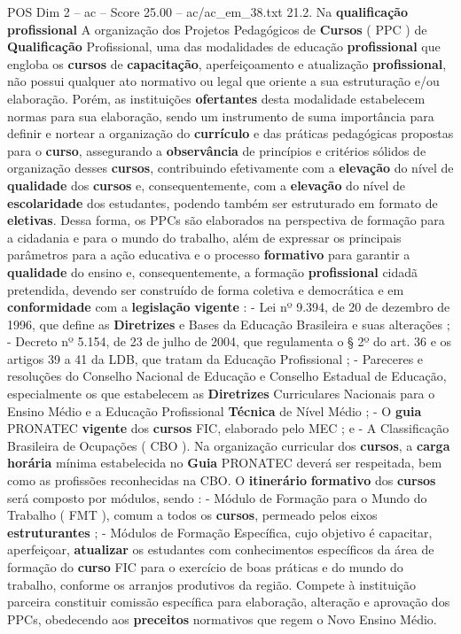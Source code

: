 \begin{textsample}{POS Dim 2 – ac – Score 25.00 – ac/ac\_em\_38.txt}  \label{ex:f2_pos_166}
21.2.
Na \textbf{qualificação} \textbf{profissional} A organização dos Projetos Pedagógicos de \textbf{Cursos} ( PPC ) de \textbf{Qualificação} Profissional, uma das modalidades de educação \textbf{profissional} que engloba os \textbf{cursos} de \textbf{capacitação}, aperfeiçoamento e atualização \textbf{profissional}, não possui qualquer ato normativo ou legal que oriente a sua estruturação e/ou elaboração.
Porém, as instituições \textbf{ofertantes} desta modalidade estabelecem normas para sua elaboração, sendo um instrumento de suma importância para definir e nortear a organização do \textbf{currículo} e das práticas pedagógicas propostas para o \textbf{curso}, assegurando a \textbf{observância} de princípios e critérios sólidos de organização desses \textbf{cursos}, contribuindo efetivamente com a \textbf{elevação} do nível de \textbf{qualidade} dos \textbf{cursos} e, consequentemente, com a \textbf{elevação} do nível de \textbf{escolaridade} dos estudantes, podendo também ser estruturado em formato de \textbf{eletivas}.
Dessa forma, os PPCs são elaborados na perspectiva de formação para a cidadania e para o mundo do trabalho, além de expressar os principais parâmetros para a ação educativa e o processo \textbf{formativo} para garantir a \textbf{qualidade} do ensino e, consequentemente, a formação \textbf{profissional} cidadã pretendida, devendo ser construído de forma coletiva e democrática e em \textbf{conformidade} com a \textbf{legislação} \textbf{vigente} : - Lei nº 9.394, de 20 de dezembro de 1996, que define as \textbf{Diretrizes} e Bases da Educação Brasileira e suas alterações ; - Decreto nº 5.154, de 23 de julho de 2004, que regulamenta o § 2º do art. 36 e os artigos 39 a 41 da LDB, que tratam da Educação Profissional ; - Pareceres e resoluções do Conselho Nacional de Educação e Conselho Estadual de Educação, especialmente os que estabelecem as \textbf{Diretrizes} Curriculares Nacionais para o Ensino Médio e a Educação Profissional \textbf{Técnica} de Nível Médio ; - O \textbf{guia} PRONATEC \textbf{vigente} dos \textbf{cursos} FIC, elaborado pelo MEC ; e - A Classificação Brasileira de Ocupações ( CBO ).
Na organização curricular dos \textbf{cursos}, a \textbf{carga} \textbf{horária} mínima estabelecida no \textbf{Guia} PRONATEC deverá ser respeitada, bem como as profissões reconhecidas na CBO.
O \textbf{itinerário} \textbf{formativo} dos \textbf{cursos} será composto por módulos, sendo : - Módulo de Formação para o Mundo do Trabalho ( FMT ), comum a todos os \textbf{cursos}, permeado pelos eixos \textbf{estruturantes} ; - Módulos de Formação Específica, cujo objetivo é capacitar, aperfeiçoar, \textbf{atualizar} os estudantes com conhecimentos específicos da área de formação do \textbf{curso} FIC para o exercício de boas práticas e do mundo do trabalho, conforme os arranjos produtivos da região.
Compete à instituição parceira constituir comissão específica para elaboração, alteração e aprovação dos PPCs, obedecendo aos \textbf{preceitos} normativos que regem o Novo Ensino Médio.


\end{textsample}
